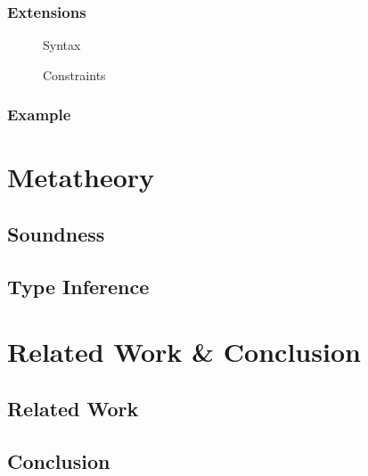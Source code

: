 \documentclass[runningheads]{llncs}
\begin{document}
\subsubsection{Extensions}
\begin{figure}[t]
  \centering
  \caption{Syntax}
\end{figure}
\begin{figure}[t]
  \centering
  \caption{Constraints}
\end{figure}
\subsubsection{Example}
\section{Metatheory}
\subsection{Soundness}
\subsection{Type Inference}
\section{Related Work \& Conclusion}
\subsection{Related Work}
\subsection{Conclusion}
\nocite{sts}
\nocite{atapl}
\printbibliography{}
\end{document}
